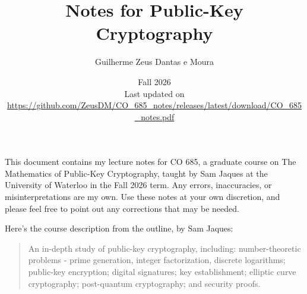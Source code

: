 \documentclass[oneside]{scrbook}
\title{Notes for Public-Key Cryptography}
\author{Guilherme Zeus Dantas e Moura}
\date{Fall 2026\\[2em]
{\normalsize Last updated on \DTMnow}\\[-0.5em]
{\scriptsize\url{https://github.com/ZeusDM/CO_685_notes/releases/latest/download/CO_685_notes.pdf}}}
\theoremstyle{definition}
\begin{document}
\maketitle

This document contains my lecture notes for CO 685,
a graduate course on The Mathematics of Public-Key Cryptography,
taught by Sam Jaques at the University of Waterloo in the Fall 2026 term.
Any errors, inaccuracies, or misinterpretations are my own.
Use these notes at your own discretion,
and please feel free to point out any corrections that may be needed.

Here's the course description from the outline, by Sam Jaques:
\begin{quote}
    An in-depth study of public-key cryptography, including: number-theoretic problems - prime generation, integer factorization, discrete logarithms; public-key encryption; digital signatures; key establishment; elliptic curve cryptography; post-quantum cryptography; and security proofs.
\end{quote}
\end{document}
